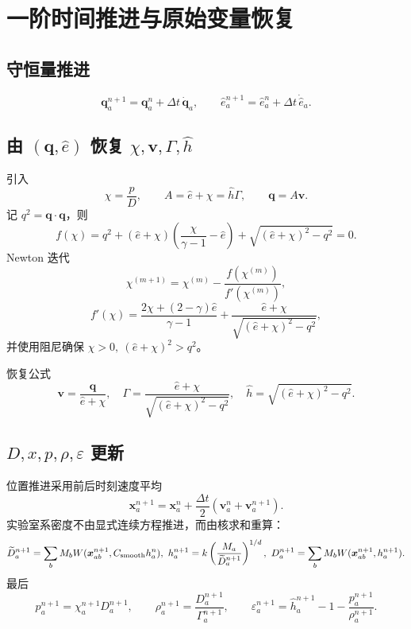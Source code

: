 \section{一阶时间推进与原始变量恢复}

\subsection{守恒量推进}
\begin{equation}
\boldsymbol{q}_a^{n+1}=\boldsymbol{q}_a^n+\Delta t\,\dot{\boldsymbol{q}}_a,\qquad
\hat{e}_a^{n+1}=\hat{e}_a^n+\Delta t\,\dot{\hat{e}}_a.
\end{equation}

\subsection{由 $(\boldsymbol{q},\hat{e})$ 恢复 $\chi,\boldsymbol{v},\Gamma,\hat{h}$}
引入
\begin{equation}
\chi=\frac{p}{D},\qquad A=\hat{e}+\chi=\hat{h}\Gamma,\qquad \boldsymbol{q}=A\boldsymbol{v}.
\end{equation}
记 $q^2=\boldsymbol{q}\cdot\boldsymbol{q}$，则
\begin{equation}
f(\chi)=q^2+(\hat{e}+\chi)\!\left(\frac{\chi}{\gamma-1}-\hat{e}\right)
+\sqrt{(\hat{e}+\chi)^2-q^2}=0.
\end{equation}
Newton 迭代
\begin{equation}
\chi^{(m+1)}=\chi^{(m)}-\frac{f(\chi^{(m)})}{f'(\chi^{(m)})},
\end{equation}
\begin{equation}
f'(\chi)=\frac{2\chi+(2-\gamma)\hat{e}}{\gamma-1}
+\frac{\hat{e}+\chi}{\sqrt{(\hat{e}+\chi)^2-q^2}},
\end{equation}
并使用阻尼确保 $\chi>0,\ (\hat{e}+\chi)^2>q^2$。

恢复公式
\begin{equation}
\boldsymbol{v}=\frac{\boldsymbol{q}}{\hat{e}+\chi},\quad
\Gamma=\frac{\hat{e}+\chi}{\sqrt{(\hat{e}+\chi)^2-q^2}},\quad
\hat{h}=\sqrt{(\hat{e}+\chi)^2-q^2}.
\end{equation}

\subsection{$D,x,p,\rho,\varepsilon$ 更新}
位置推进采用前后时刻速度平均
\begin{equation}
\boldsymbol{x}_a^{n+1}=\boldsymbol{x}_a^n+\frac{\Delta t}{2}
\left(\boldsymbol{v}_a^n+\boldsymbol{v}_a^{n+1}\right).
\end{equation}
实验室系密度不由显式连续方程推进，而由核求和重算：
\begin{equation}
\widetilde{D}_a^{n+1}=\sum_b M_bW(\boldsymbol{x}_{ab}^{n+1},C_{\rm smooth}h_a^n),\ 
h_a^{n+1}=k\left(\frac{M_a}{\widetilde{D}_a^{n+1}}\right)^{1/d},\ 
D_a^{n+1}=\sum_bM_bW(\boldsymbol{x}_{ab}^{n+1},h_a^{n+1}).
\end{equation}
最后
\begin{equation}
p_a^{n+1}=\chi_a^{n+1}D_a^{n+1},\qquad
\rho_a^{n+1}=\frac{D_a^{n+1}}{\Gamma_a^{n+1}},\qquad
\varepsilon_a^{n+1}=\hat{h}_a^{n+1}-1-\frac{p_a^{n+1}}{\rho_a^{n+1}}.
\end{equation}

